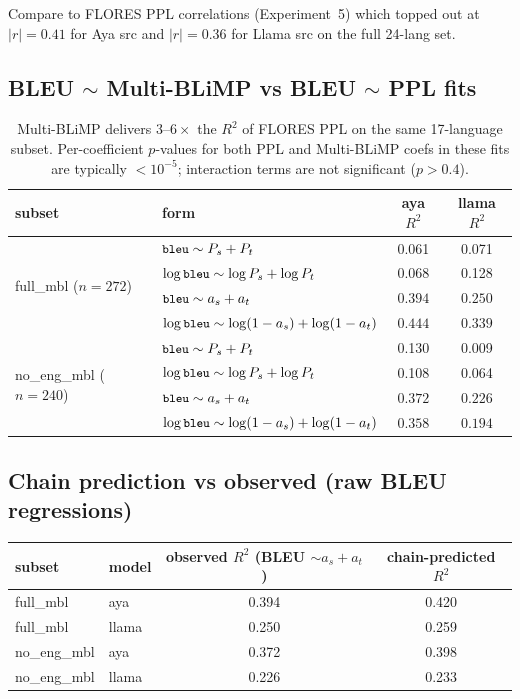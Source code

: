 \documentclass[11pt]{article}
\newcommand{\code}[1]{\texttt{\small #1}}
\begin{document}
Compare to FLORES PPL correlations (Experiment~5) which topped out at
$|r| = 0.41$ for Aya src and $|r| = 0.36$ for Llama src on the full
24-lang set.

\subsection{BLEU $\sim$ Multi-BLiMP vs BLEU $\sim$ PPL fits}

\begin{table}[h]
\centering
\small
\begin{tabular}{llcc}
\toprule
subset & form & aya $R^2$ & llama $R^2$ \\
\midrule
\multirow{4}{*}{full\_mbl ($n=272$)}
 & $\code{bleu} \sim P_s + P_t$                              & 0.061 & 0.071 \\
 & $\log\code{bleu} \sim \log P_s + \log P_t$                & 0.068 & 0.128 \\
 & $\code{bleu} \sim a_s + a_t$                              & $\mathbf{0.394}$ & $\mathbf{0.250}$ \\
 & $\log\code{bleu} \sim \log(1-a_s) + \log(1-a_t)$          & $\mathbf{0.444}$ & $\mathbf{0.339}$ \\
\midrule
\multirow{4}{*}{no\_eng\_mbl ($n=240$)}
 & $\code{bleu} \sim P_s + P_t$                              & 0.130 & 0.009 \\
 & $\log\code{bleu} \sim \log P_s + \log P_t$                & 0.108 & 0.064 \\
 & $\code{bleu} \sim a_s + a_t$                              & $\mathbf{0.372}$ & $\mathbf{0.226}$ \\
 & $\log\code{bleu} \sim \log(1-a_s) + \log(1-a_t)$          & $\mathbf{0.358}$ & $\mathbf{0.194}$ \\
\bottomrule
\end{tabular}
\caption{Multi-BLiMP delivers $3$--$6\times$ the $R^2$ of FLORES PPL on
the same 17-language subset. Per-coefficient $p$-values for both PPL
and Multi-BLiMP coefs in these fits are typically $< 10^{-5}$;
interaction terms are not significant ($p > 0.4$).}
\end{table}

\subsection{Chain prediction vs observed (raw BLEU regressions)}

\begin{center}
\small
\begin{tabular}{llcc}
\toprule
subset & model & observed $R^2$ (BLEU $\sim a_s + a_t$) & chain-predicted $R^2$ \\
\midrule
full\_mbl    & aya   & 0.394 & 0.420 \\
full\_mbl    & llama & 0.250 & 0.259 \\
no\_eng\_mbl & aya   & 0.372 & 0.398 \\
no\_eng\_mbl & llama & 0.226 & 0.233 \\
\bottomrule
\end{tabular}
\end{center}
\end{document}
